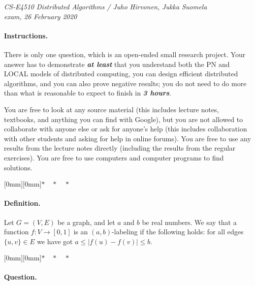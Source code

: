 \documentclass[12pt,a4paper]{article}
\newcommand{\sep}{{\centering \raisebox{-3mm}[0mm][0mm]{$*\quad*\quad*$}\par}}
\newcommand{\hl}[1]{\textbf{\emph{#1}}}
\begin{document}
\noindent
\emph{CS-E4510 Distributed Algorithms / Juho Hirvonen, Jukka Suomela\\
exam, 26 February 2020}

\paragraph{Instructions.}

There is only one question, which is an open-ended small research project. Your answer has to demonstrate \hl{at least} that you understand both the PN and LOCAL models of distributed computing, you can design efficient distributed algorithms, and you can also prove negative results; you do not need to do more than what is reasonable to expect to finish in \hl{3 hours}.

You are free to look at any source material (this includes lecture notes, textbooks, and anything you can find with Google), but you are not allowed to collaborate with anyone else or ask for anyone's help (this includes collaboration with other students and asking for help in online forums). You are free to use any results from the lecture notes directly (including the results from the regular exercises). You are free to use computers and computer programs to find solutions.

\sep

\paragraph{Definition.}

Let $G = (V,E)$ be a graph, and let $a$ and $b$ be real numbers. We say that a function $f\colon V \to [0,1]$ is an $(a,b)$-labeling if the following holds: for all edges $\{u,v\} \in E$ we have got $a \le \bigl|f(u) - f(v)\bigr| \le b$.

\sep

\paragraph{Question.}
\end{document}
